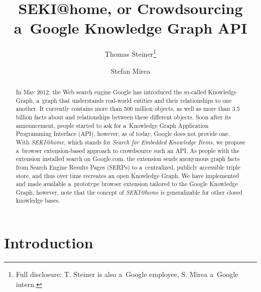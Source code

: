 \documentclass[runningheads,a4paper]{llncs}
\begin{document}
\title{SEKI@home, or Crowdsourcing\\ a~Google Knowledge Graph API}

\author{
  Thomas Steiner\thanks{Full disclosure: T. Steiner is also a~Google employee, S. Mirea a~Google intern.} \and
  Stefan Mirea
}


\maketitle
\setcounter{footnote}{0}

\begin{abstract}
In May 2012, the Web search engine Google has introduced the so-called Knowledge Graph,
a~graph that understands real-world entities and their relationships to one another.
It currently contains more than 500 million objects,
as well as more than 3.5 billion facts about
and relationships between these different objects.
Soon after its announcement, people started to ask
for a~Knowledge Graph Application Programming Interface (API),
however, as of today, Google does not provide one.
With \emph{SEKI@home}, which stands for \emph{Search for Embedded Knowledge Items},
we propose a~browser extension-based approach to crowdsource such an API.
As people with the extension installed search on Google.com,
the extension sends anonymous graph facts from Search Engine Results Pages (SERPs)
to a~centralized, publicly accessible triple store,
and thus over time recreates an open Knowledge Graph.
We have implemented and made available a~prototype browser extension
tailored to the Google Knowledge Graph, however,
note that the concept of \emph{SEKI@home} is generalizable for other closed knowledge bases.
\end{abstract}

\section{Introduction}
\end{document}
